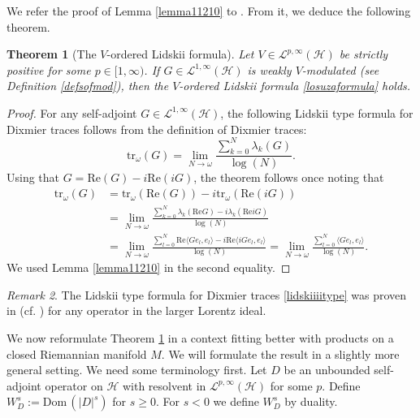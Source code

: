 \documentclass[10pt]{amsart}
\newtheorem{thm}{Theorem}[section]
\theoremstyle{remark}
\newtheorem{remark}[thm]{Remark}
\theoremstyle{definition}
\begin{document}
We refer the proof of Lemma \ref{lemma11210} to \cite{sukolord}. From it, we deduce the following theorem.

\begin{thm}[The $V$-ordered Lidskii formula]
\label{vmodthm}
Let $V\in \mathcal{L}^{p,\infty}({\mathcal{H}})$ be strictly positive for some $p\in [1,\infty)$. If $G\in \mathcal{L}^{1,\infty}({\mathcal{H}})$ is weakly $V$-modulated (see Definition \ref{defsofmod}), then the $V$-ordered Lidskii formula \eqref{losuzaformula} holds.
\end{thm}

\begin{proof}
For any self-adjoint $G\in \mathcal{L}^{1,\infty}({\mathcal{H}})$, the following Lidskii type formula for Dixmier traces follows from the definition of Dixmier traces:
\begin{equation}
\label{lidskiiiitype}
{\mathrm{t}\mathrm{r}}_\omega(G)=\lim_{N\to \omega}\frac{\sum_{k=0}^N\lambda_k(G)}{\log(N)}.
\end{equation}
Using that $G=\mathrm{Re}(G)-i\mathrm{Re}(iG)$, the theorem follows once noting that
\begin{align*}
{\mathrm{t}\mathrm{r}}_\omega(G)&={\mathrm{t}\mathrm{r}}_\omega(\mathrm{Re}(G))-i{\mathrm{t}\mathrm{r}}_\omega(\mathrm{Re}(iG))\\
&=\lim_{N\to \omega}\frac{\sum_{k=0}^N\lambda_k(\mathrm{Re}G)-i\lambda_k(\mathrm{Re}iG)}{\log(N)}\\
&=\lim_{N\to \omega}\frac{\sum_{l=0}^N\mathrm{Re}\langle Ge_l,e_l\rangle-i\mathrm{Re}\langle iGe_l,e_l\rangle}{\log(N)}=\lim_{N\to \omega}\frac{\sum_{l=0}^N\langle Ge_l,e_l\rangle}{\log(N)}.
\end{align*}
We used Lemma \ref{lemma11210} in the second equality.
\end{proof}

\begin{remark}
The Lidskii type formula for Dixmier traces \eqref{lidskiiiitype} was proven in \cite[Theorem 7.3.1]{sukolord} (cf. \cite[Theorem 1]{lidskiitypesesuza}) for any operator in the larger Lorentz ideal.
\end{remark}

We now reformulate Theorem \ref{vmodthm} in a context fitting better with products on a closed Riemannian manifold $M$. We will formulate the result in a slightly more general setting. We need some terminology first. Let $D$ be an unbounded self-adjoint operator on ${\mathcal{H}}$ with resolvent in $\mathcal{L}^{p,\infty}({\mathcal{H}})$ for some $p$. Define $W_D^s:={\mathrm{Dom}\,}(|D|^s)$ for $s\geq 0$. For $s<0$ we define $W_D^s$ by duality. 
\end{document}
